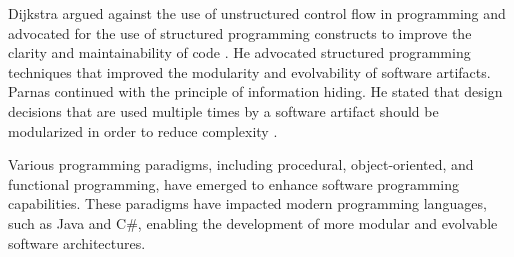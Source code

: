 Dijkstra argued against the use of unstructured control flow in programming and advocated
for the use of structured programming constructs to improve the clarity and
maintainability of code \parencite{dijkstra_letters_1968}. He advocated structured
programming techniques that improved the modularity and evolvability of software
artifacts. Parnas continued with the principle of information hiding. He stated that
design decisions that are used multiple times by a software artifact should be modularized
in order to reduce complexity \parencite{parnas_criteria_1972}. 

Various programming paradigms, including procedural, object-oriented, and functional
programming, have emerged to enhance software programming capabilities. These paradigms
have impacted modern programming languages, such as Java and C\#, enabling the development
of more modular and evolvable software architectures. 







